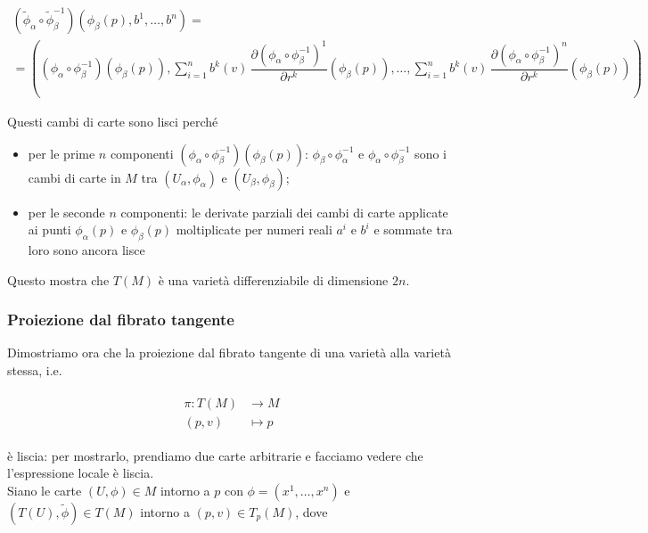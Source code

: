 \begin{multline}
	(\tilde{\phi}_{\alpha} \circ \tilde{\phi}_{\beta}^{-1}) (\phi_{\beta}(p), b^{1},\dots,b^{n}) =\\
	= \left( (\phi_{\alpha} \circ \phi_{\beta}^{-1})(\phi_{\beta}(p)), \sum_{i=1}^{n} b^{k}(v) \, \dfrac{\partial (\phi_{\alpha} \circ \phi_{\beta}^{-1})^{1}}{\partial r^{k}} (\phi_{\beta}(p)) ,\dots, \sum_{i=1}^{n} b^{k}(v) \, \dfrac{\partial (\phi_{\alpha} \circ \phi_{\beta}^{-1})^{n}}{\partial r^{k}} (\phi_{\beta}(p)) \right)
\end{multline}

Questi cambi di carte sono lisci perché

\begin{itemize}
	\item per le prime $ n $ componenti $ (\phi_{\alpha} \circ \phi_{\beta}^{-1})(\phi_{\beta}(p)) $: $ \phi_{\beta} \circ \phi_{\alpha}^{-1} $ e $ \phi_{\alpha} \circ \phi_{\beta}^{-1} $ sono i cambi di carte in $ M $ tra $ (U_{\alpha},\phi_{\alpha}) $ e $ (U_{\beta},\phi_{\beta}) $;
	
	\item per le seconde $ n $ componenti: le derivate parziali dei cambi di carte applicate ai punti $ \phi_{\alpha}(p) $ e $ \phi_{\beta}(p) $ moltiplicate per numeri reali $ a^{i} $ e $ b^{i} $ e sommate tra loro sono ancora lisce
\end{itemize}

Questo mostra che $ T(M) $ è una varietà differenziabile di dimensione $ 2n $.

\subsubsection{Proiezione dal fibrato tangente}

Dimostriamo ora che la proiezione dal fibrato tangente di una varietà alla varietà stessa, i.e.

\begin{align}
	\begin{split}
		\pi : T(M) &\to M\\
		(p,v) &\mapsto p
	\end{split}
\end{align}

è liscia: per mostrarlo, prendiamo due carte arbitrarie e facciamo vedere che l'espressione locale è liscia.\\
Siano le carte $ (U,\phi) \in M $ intorno a $ p $ con $ \phi = (x^{1},\dots,x^{n}) $ e $ (T(U),\tilde{\phi}) \in T(M) $ intorno a $ (p,v) \in T_{p}(M) $, dove

